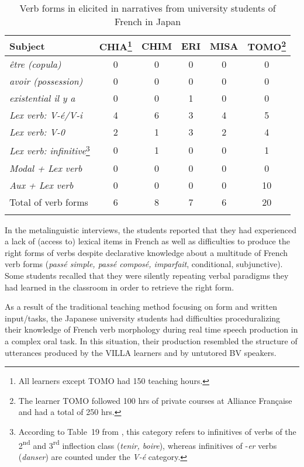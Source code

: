 \documentclass[output=paper]{langscibook}
\begin{document}
\begin{table}
\begin{tabular}{lccccc}
\lsptoprule
Subject & {CHIA}\footnote{All learners except TOMO had 150 teaching hours.} & {CHIM} & {ERI}  & {MISA}  & {TOMO}\footnote{The learner TOMO followed 100 hrs of private courses at Alliance Française and had a total of 250 hrs.}\\\midrule
{\itshape être (copula)} & 0 & 0 & 0 & 0 & 0\\
{\itshape avoir (possession)} & 0 & 0 & 0 & 0 & 0\\
{\itshape existential il y a} & 0 & 0 & 1 & 0 & 0\\
{\itshape Lex verb: V-é/V-i} & 4 & 6 & 3 & 4 & 5\\
{\itshape Lex verb: V-0} & 2 & 1 & 3 & 2 & 4\\
\textit{Lex verb: infinitive}\footnote{{According to} Table~19 from \citet[166]{Kerrou2019}, this {category refers to infinitives of verbs of the 2}{\textsuperscript{nd}} {and 3}{\textsuperscript{rd}} {inflection class (}{\textit{tenir, boire}}{), whereas} {infinitives of -}{\textit{er}} {verbs (}{\textit{danser}}{) are counted under the} {\textit{V-é}} {category.}} & 0 & 1 & 0 & 0 & 1\\
{\itshape Modal + Lex verb} & 0 & 0 & 0 & 0 & 0\\
{\itshape Aux + Lex verb} & 0 & 0 & 0 & 0 & 10\\\addlinespace
{Total of verb forms}  & 6 & 8 & 7 & 6 & 20\\
\lspbottomrule
\end{tabular}
\caption{\label{tab:benazzo:3}Verb forms in elicited in narratives from university students of French in Japan}
\end{table}

In the metalinguistic interviews, the students reported that they had experienced a lack of (access to) lexical items in French as well as difficulties to produce the right forms of verbs despite declarative knowledge about a multitude of French verb forms (\textit{passé simple, passé composé, imparfait}, conditional, subjunctive). Some students recalled that they were silently repeating verbal paradigms they had learned in the classroom in order to retrieve the right form.

As a result of the traditional teaching method focusing on form and written input/tasks, the Japanese university students had difficulties proceduralizing their knowledge of French verb morphology during real time speech production in a complex oral task. In this situation, their production resembled the structure of utterances produced by the VILLA learners and by untutored BV speakers.\largerpage
\end{document}
